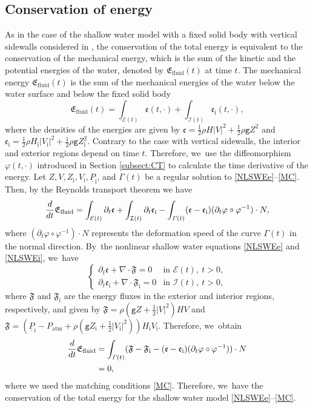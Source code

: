 \documentclass[11pt]{article}
\newcommand{\gr}{{\mathtt g}}
\newcommand{\dt}{\partial_t}
\newcommand{\cI}{{\mathcal I}}
\newcommand{\cE}{{\mathcal E}}
\newcommand{\ul}[1]{\underline{#1}}
\newcommand{\itGamma}{\mathit{\Gamma}}
\theoremstyle{definition}
\begin{document}
\subsection{Conservation of energy}\label{sectconsNRJ}
As in the case of the shallow water model with a fixed solid body with vertical sidewalls considered in \cite{IguchiLannes2023},
the conservation of the total energy is equivalent to the conservation of the mechanical energy,
which is the sum of the kinetic and the potential energies of the water, denoted by $\mathfrak{E}_\mathrm{fluid}(t)$ at time $t$.
The mechanical energy $\mathfrak{E}_\mathrm{fluid}(t)$ is the sum of the mechanical energies of the water below the water surface and below the fixed solid body
\[
\mathfrak{E}_\mathrm{fluid}(t) = \int_{\cE(t)}\mathfrak{e}(t,\cdot) + \int_{\cI(t)}\mathfrak{e}_\mathrm{i}(t,\cdot),
\]
where the densities of the energies are given by $\mathfrak{e} = \frac12\rho H|V|^2 + \frac12\rho\gr Z^2$
and $\mathfrak{e}_\mathrm{i} = \frac12\rho H_\mathrm{i}|V_\mathrm{i}|^2+\frac12\rho\gr Z_\mathrm{i}^2$.
Contrary to the case with vertical sidewalls, the interior and exterior regions depend on time $t$.
Therefore, we~use the diffeomorphism $\varphi(t,\cdot)$ introduced in Section \ref{subsect:CT} to calculate the time derivative of the energy.
Let $Z,V,Z_\mathrm{i},V_\mathrm{i},\ul{P}_\mathrm{i}$, and $\itGamma(t)$ be a regular solution to \eqref{NLSWEe}--\eqref{MC}.
Then, by the Reynolds transport theorem we have
\[
\frac{\rm d}{{\rm d}t}\mathfrak{E}_\mathrm{fluid}
= \int_{\cE(t)}\dt\mathfrak{e} + \int_{\cI(t)}\dt\mathfrak{e}_\mathrm{i} - \int_{\itGamma(t)}(\mathfrak{e}-\mathfrak{e}_\mathrm{i})(\dt\varphi\circ\varphi^{-1})\cdot N,
\]
where $(\dt\varphi\circ\varphi^{-1})\cdot N$ represents the deformation speed of the curve $\itGamma(t)$ in the normal direction. By~the nonlinear shallow water equations \eqref{NLSWEe} and \eqref{NLSWEi}, we~have
\[
\begin{cases}
\dt\mathfrak{e} + \nabla\cdot\mathfrak{F} = 0 &\text{in } \cE(t), \ t>0, \\
\dt\mathfrak{e}_\mathrm{i} + \nabla\cdot\mathfrak{F}_\mathrm{i} = 0 &\text{in } \cI(t), \ t>0,
\end{cases}
\]
where $\mathfrak{F}$ and $\mathfrak{F}_\mathrm{i}$ are the energy fluxes in the exterior and interior regions, respectively, and given by
$\mathfrak{F}=\rho(\gr Z+\frac12|V|^2)HV$ and $\mathfrak{F}=(\ul{P}_\mathrm{i}-P_\mathrm{atm}+\rho(\gr Z_\mathrm{i}+\frac12|V_\mathrm{i}|^2))H_\mathrm{i}V_\mathrm{i}$.
Therefore, we~obtain
\begin{align*}
\frac{\rm d}{{\rm d}t}\mathfrak{E}_\mathrm{fluid}
&= \int_{\itGamma(t)}(\mathfrak{F}-\mathfrak{F}_\mathrm{i}-(\mathfrak{e}-\mathfrak{e}_\mathrm{i})(\dt\varphi\circ\varphi^{-1}))\cdot N \\
&= 0,
\end{align*}
where we used the matching conditions \eqref{MC}.
Therefore, we~have the conservation of the total energy for the shallow water model \eqref{NLSWEe}--\eqref{MC}.
\end{document}
